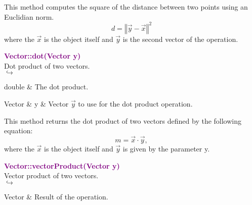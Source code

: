 This method computes the square of the distance between two points using an Euclidian norm.
\begin{equation*}
d = {\left\Vert \overrightarrow{y} - \overrightarrow{x} \right\Vert}^2
\end{equation*}
where the $\overrightarrow{x}$ is the object itself and $\overrightarrow{y}$ is the second vector of the operation.

\textcolor{purple}{\textbf{Vector::dot(Vector y)}}\label{Vector::dot(Vector y)}\\
Dot product of two vectors.\\ \hspace*{5mm}$\hookrightarrow$
\vspace*{-2em}\begin{tcolorbox}[grow to left by=-1cm, width=\textwidth-1cm,myArgs,tabularx={l|R}]
double & The dot product.
\end{tcolorbox}

\begin{tcolorbox}[width=\textwidth,myArgs,tabularx={ll|R}]
Vector & y & Vector $\overrightarrow{y}$ to use for the dot product operation.
\end{tcolorbox}

This method returns the dot product of two vectors defined by the following equation:
\begin{equation*}
m = \overrightarrow{x}\cdot\overrightarrow{y},
\end{equation*}
where the $\overrightarrow{x}$ is the object itself and $\overrightarrow{y}$ is given by the parameter y.

\textcolor{purple}{\textbf{Vector::vectorProduct(Vector y)}}\label{Vector::vectorProduct(Vector y)}\\
Vector product of two vectors.\\ \hspace*{5mm}$\hookrightarrow$
\vspace*{-2em}\begin{tcolorbox}[grow to left by=-1cm, width=\textwidth-1cm,myArgs,tabularx={l|R}]
Vector & Result of the operation.
\end{tcolorbox}

